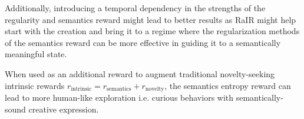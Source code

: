 Additionally, introducing a temporal dependency in the strengths of the regularity and semantics reward might lead to better results as RaIR might help start with the creation and bring it to a regime where the regularization methods of the semantics reward can be more effective in guiding it to a semantically meaningful state.






When used as an additional reward to augment traditional novelty-seeking intrinsic rewards \(r_{\text{intrinsic}} = r_{\text{semantics}} + r_{\text{novelty}}\), the semantics entropy reward can lead to more human-like exploration i.e. curious behaviors with semantically-sound creative expression.
